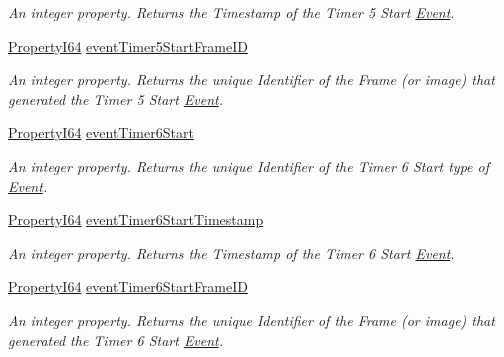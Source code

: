 \begin{DoxyCompactItemize}
\begin{DoxyCompactList}\small\item\em An integer property. Returns the Timestamp of the Timer 5 Start \hyperlink{classmv_i_m_p_a_c_t_1_1acquire_1_1_event}{Event}. \end{DoxyCompactList}\item 
\hyperlink{group___common_interface_ga81749b2696755513663492664a18a893}{Property\+I64} \hyperlink{classmv_i_m_p_a_c_t_1_1acquire_1_1_gen_i_cam_1_1_event_control_ac68a2858057c8ccae312c2024635fea5}{event\+Timer5\+Start\+Frame\+I\+D}
\begin{DoxyCompactList}\small\item\em An integer property. Returns the unique Identifier of the Frame (or image) that generated the Timer 5 Start \hyperlink{classmv_i_m_p_a_c_t_1_1acquire_1_1_event}{Event}. \end{DoxyCompactList}\item 
\hyperlink{group___common_interface_ga81749b2696755513663492664a18a893}{Property\+I64} \hyperlink{classmv_i_m_p_a_c_t_1_1acquire_1_1_gen_i_cam_1_1_event_control_ade3a2787878740154a0379950eab3f63}{event\+Timer6\+Start}
\begin{DoxyCompactList}\small\item\em An integer property. Returns the unique Identifier of the Timer 6 Start type of \hyperlink{classmv_i_m_p_a_c_t_1_1acquire_1_1_event}{Event}. \end{DoxyCompactList}\item 
\hyperlink{group___common_interface_ga81749b2696755513663492664a18a893}{Property\+I64} \hyperlink{classmv_i_m_p_a_c_t_1_1acquire_1_1_gen_i_cam_1_1_event_control_a191de3898acdfd25b4871858e0613a43}{event\+Timer6\+Start\+Timestamp}
\begin{DoxyCompactList}\small\item\em An integer property. Returns the Timestamp of the Timer 6 Start \hyperlink{classmv_i_m_p_a_c_t_1_1acquire_1_1_event}{Event}. \end{DoxyCompactList}\item 
\hyperlink{group___common_interface_ga81749b2696755513663492664a18a893}{Property\+I64} \hyperlink{classmv_i_m_p_a_c_t_1_1acquire_1_1_gen_i_cam_1_1_event_control_a7fcc34fb079daa8b9b2c23ad8cd890dd}{event\+Timer6\+Start\+Frame\+I\+D}
\begin{DoxyCompactList}\small\item\em An integer property. Returns the unique Identifier of the Frame (or image) that generated the Timer 6 Start \hyperlink{classmv_i_m_p_a_c_t_1_1acquire_1_1_event}{Event}. \end{DoxyCompactList}\item 

\end{DoxyCompactItemize}
